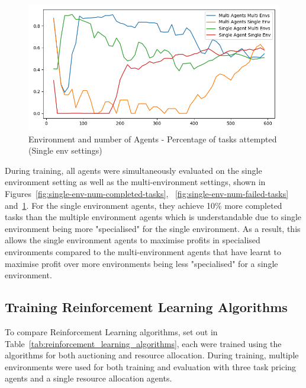 \begin{figure}[H]
    \centering
    \includegraphics[width=\linewidth]{figures/5_evaluation_figs/env_agent_num_training_fig/single_env_percent_tasks.png}
    \caption{Environment and number of Agents - Percentage of tasks attempted (Single env settings)}
    \label{fig:single-env-percent-tasks}
\end{figure}

During training, all agents were simultaneously evaluated on the single environment setting as well as the
multi-environment settings, shown in Figures~\ref{fig:single-env-num-completed-tasks},
~\ref{fig:single-env-num-failed-tasks} and~\ref{fig:single-env-percent-tasks}. For the single environment agents, they
achieve 10\% more completed tasks than the multiple environment agents which is understandable due to single environment
being more "specialised" for the single environment. As a result, this allows the single environment agents to maximise
profits in specialised environments compared to the multi-environment agents that have learnt to maximise profit over
more environments being less "specialised" for a single environment.

\subsection{Training Reinforcement Learning Algorithms}
\label{subsec:training-reinforcement-learning-algorithms}
To compare Reinforcement Learning algorithms, set out in Table~\ref{tab:reinforcement_learning_algorithms},
each were trained using the algorithms for both auctioning and resource allocation. During training, multiple
environments were used for both training and evaluation with three task pricing agents and a single resource allocation
agents.

